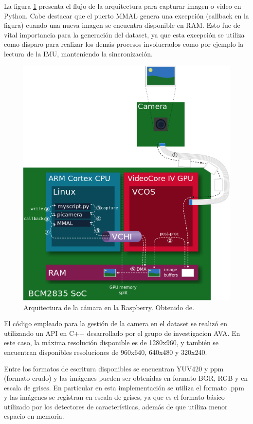 La figura \ref{imagen:ArquitecturaCamara} presenta el flujo de la arquitectura para capturar imagen o video en Python. Cabe destacar que el puerto MMAL genera una excepción (callback en la figura) cuando una nueva imagen se encuentra disponible en RAM. Esto fue de vital importancia para la generación del dataset, ya que esta excepción se utiliza como disparo para realizar los demás procesos involucrados como por ejemplo la lectura de la IMU, manteniendo la sincronización.


\begin{figure}[H]
	\centering		\includegraphics[width=0.7\linewidth]{imagenes/prototipo/camera_architecture}
	\caption[Arquitectura de la cámara]{Arquitectura de la cámara en la Raspberry. Obtenido de\protect\footnotemark.}
	\label{imagen:ArquitecturaCamara}

\end{figure}

El código empleado para la gestión de la camera en el dataset se realizó en  utilizando un API en C++ desarrollado por el grupo de investigacion AVA\protect\footnotemark. En este caso, la máxima resolución disponible es de 1280x960, y también se encuentran disponibles resoluciones de 960x640, 640x480 y 320x240.

Entre los formatos de escritura disponibles se encuentran YUV420 y ppm (formato crudo) y las imágenes pueden ser obtenidas en formato BGR, RGB y en escala de grises. En particular en esta implementación se utiliza el formato .ppm y las imágenes se registran en escala de grises, ya que es el formato básico utilizado por los detectores  de características, además de que utiliza menor espacio en memoria.

